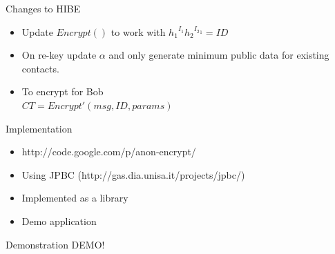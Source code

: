 \documentclass{beamer}
\begin{document}
\begin{frame}{Changes to HIBE}

\begin{itemize}
\item Update $Encrypt()$ to work with ${h_1}^{I_1}{h_2}^{{I_2}_1} = ID$
\item On re-key update $\alpha$ and only generate minimum public data for existing contacts.
\item To encrypt for Bob \\ $CT = Encrypt'(msg, ID, params)$

\end{itemize}
\end{frame}


\begin{frame}{Implementation}
\begin{itemize}
\item http://code.google.com/p/anon-encrypt/
\item Using JPBC (http://gas.dia.unisa.it/projects/jpbc/)
\item Implemented as a library
\item Demo application
\end{itemize}
\end{frame}

\begin{frame}{Demonstration}
DEMO!
\end{frame}
\end{document}
